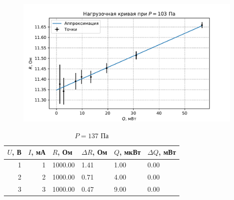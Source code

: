 \begin{figure}[H]\centering\includegraphics[width=\textwidth]{graphs/RQ103.34132342824749.pdf}\end{figure}\begin{table}[H]
\centering
\caption{$P = 137$ Па}
\begin{tabular}{rrllll}
\hline
 $U$, В &  $I$, мА &       $R$, Ом & $\Delta R$, Ом &    $Q$, мкВт & $\Delta Q$, мВт \\ \hline
    1 &      1 & 1000.00 &           1.41 & 1.00 &            0.00 \\ \hline
    2 &      2 & 1000.00 &           0.71 & 4.00 &            0.00 \\ \hline
    3 &      3 & 1000.00 &           0.47 & 9.00 &            0.00 \\ \hline
\end{tabular}
\end{table}
